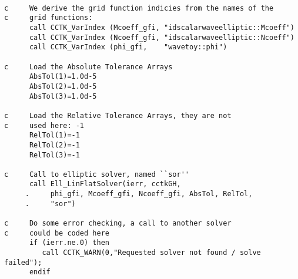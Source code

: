 \documentclass{article}
\begin{document}
\begin{verbatim}

c     We derive the grid function indicies from the names of the 
c     grid functions:
      call CCTK_VarIndex (Mcoeff_gfi, "idscalarwaveelliptic::Mcoeff")
      call CCTK_VarIndex (Ncoeff_gfi, "idscalarwaveelliptic::Ncoeff")
      call CCTK_VarIndex (phi_gfi,    "wavetoy::phi")

c     Load the Absolute Tolerance Arrays
      AbsTol(1)=1.0d-5
      AbsTol(2)=1.0d-5
      AbsTol(3)=1.0d-5

c     Load the Relative Tolerance Arrays, they are not
c     used here: -1
      RelTol(1)=-1
      RelTol(2)=-1
      RelTol(3)=-1

c     Call to elliptic solver, named ``sor''
      call Ell_LinFlatSolver(ierr, cctkGH, 
     .     phi_gfi, Mcoeff_gfi, Ncoeff_gfi, AbsTol, RelTol,
     .     "sor")

c     Do some error checking, a call to another solver 
c     could be coded here
      if (ierr.ne.0) then
         call CCTK_WARN(0,"Requested solver not found / solve failed");
      endif
\end{verbatim}
\end{document}
